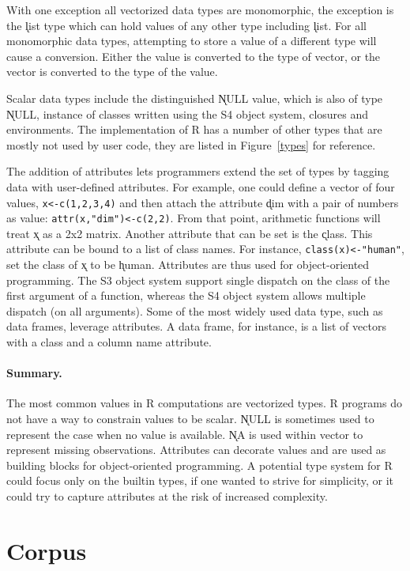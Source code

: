 \documentclass[acmsmall,10pt,review,anonymous]{acmart}\settopmatter{printfolios=true,printccs=false,printacmref=false}
\newcommand{\code}[1]{\lstinline|#1|\xspace}
\begin{document}
With one exception all vectorized data types are monomorphic, the exception
is the \k{list} type which can hold values of any other type including
\k{list}. For all monomorphic data types, attempting to store a value of a
different type will cause a conversion. Either the value is converted to the
type of vector, or the vector is converted to the type of the value.

Scalar data types include the distinguished \k{NULL} value, which is also of
type \k{NULL}, instance of classes written using the S4 object system,
closures and environments.  The implementation of R has a number of other
types that are mostly not used by user code, they are listed in
Figure~\ref{types} for reference.

The addition of attributes lets programmers extend the set of types by
tagging data with user-defined attributes. For example, one could define a
vector of four values, \code{x<-c(1,2,3,4)} and then attach the attribute
\k{dim} with a pair of numbers as value: \code{attr(x,"dim")<-c(2,2)}.  From
that point, arithmetic functions will treat \k{x} as a 2x2 matrix. Another
attribute that can be set is the \k{class}.  This attribute can be bound to
a list of class names. For instance, \code{class(x)<-"human"}, set the class
of \k{x} to be \k{human}.  Attributes are thus used for object-oriented
programming. The S3 object system support single dispatch on the class of
the first argument of a function, whereas the S4 object system allows
multiple dispatch (on all arguments). Some of the most widely used data
type, such as data frames, leverage attributes. A data frame, for instance,
is a list of vectors with a class and a column name attribute.

\paragraph{Summary.} The most common values in R computations are vectorized
types. R programs do not have a way to constrain values to be scalar.
\k{NULL} is sometimes used to represent the case when no value is
available. \k{NA} is used within vector to represent missing observations.
Attributes can decorate values and are used as building blocks for
object-oriented programming. A potential type system for R could focus only
on the builtin types, if one wanted to strive for simplicity, or it could
try to capture attributes at the risk of increased complexity.

\newpage
\section{Corpus}\label{sec:corpus}
\end{document}
